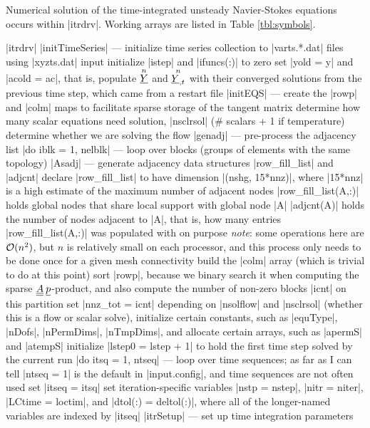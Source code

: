 \documentclass[11pt]{article}
\begin{document}
Numerical solution of the time-integrated unsteady Navier-Stokes equations occurs within |itrdrv|. Working arrays are listed in Table \ref{tbl:symbols}.
\begin{outline}[deep]
\1 |itrdrv|
	\2 |initTimeSeries| --- initialize time series collection to |varts.*.dat| files using |xyzts.dat| input
	\2 initialize |istep| and |ifuncs(:)| to zero
	\2 set |yold = y| and |acold = ac|, that is, populate $\oset{n}{\ul{Y}}$ and $\oset{n}{\ul{Y}_{,t}}$ with their converged solutions from the previous time step, which came from a restart file
	\2 |initEQS| --- create the |rowp| and |colm| maps to facilitate sparse storage of the tangent matrix
		\3 determine how many scalar equations need solution, |nsclrsol| (\# scalars + 1 if temperature)
		\3 determine whether we are solving the flow
		\3 |genadj| --- pre-process the adjacency list
			\4 |do iblk = 1, nelblk| --- loop over blocks (groups of elements with the same topology)
				\5 |Asadj| --- generate adjacency data structures |row_fill_list| and |adjcnt|
					\6 declare |row_fill_list| to have dimension |(nshg, 15*nnz)|, where |15*nnz| is a high estimate of the maximum number of adjacent nodes
					\6 |row_fill_list(A,:)| holds global nodes that share local support with global node |A|
					\6 |adjcnt(A)| holds the number of nodes adjacent to |A|, that is, how many entries |row_fill_list(A,:)| was populated with on purpose
					\6 \emph{note}: some operations here are $\mathcal{O}(n^2)$, but $n$ is relatively small on each processor, and this process only needs to be done once for a given mesh connectivity
			\4 build the |colm| array (which is trivial to do at this point)
			\4 sort |rowp|, because we binary search it when computing the sparse $\underline{\underline{A}}\:\underline{p}$-product, and also compute the number of non-zero blocks |icnt| on this partition
		\3 set |nnz_tot = icnt|
		\3 depending on |nsolflow| and |nsclrsol| (whether this is a flow or scalar solve), initialize certain constants, such as |equType|, |nDofs|, |nPermDims|, |nTmpDims|, and allocate certain arrays, such as |apermS| and |atempS|
	\2 initialize |lstep0 = lstep + 1| to hold the first time step solved by the current run
	\2 |do itsq = 1, ntseq| --- loop over time sequences; as far as I can tell |ntseq = 1| is the default in |input.config|, and time sequences are not often used
		\3 set |itseq = itsq|
		\3 set iteration-specific variables |nstp = nstep|, |nitr = niter|, |LCtime = loctim|, and |dtol(:) = deltol(:)|, where all of the longer-named variables are indexed by |itseq|
		\3 |itrSetup| --- set up time integration parameters

\end{outline}
\end{document}
